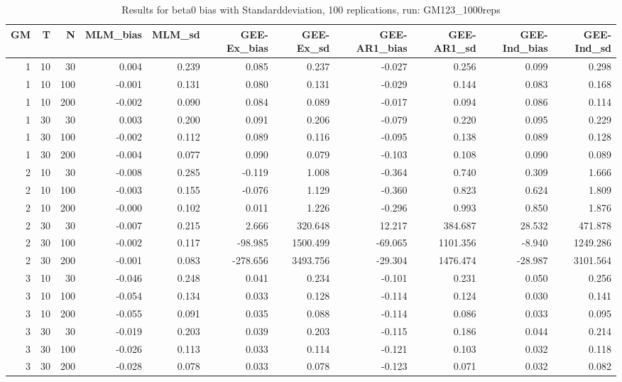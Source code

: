 \begin{table}[ht]
\centering
\begin{tabular}{rrrrrrrrrrr}
  \hline
GM & T & N & MLM\_bias & MLM\_sd & GEE-Ex\_bias & GEE-Ex\_sd & GEE-AR1\_bias & GEE-AR1\_sd & GEE-Ind\_bias & GEE-Ind\_sd \\ 
  \hline
1 & 10 & 30 & 0.004 & 0.239 & 0.085 & 0.237 & -0.027 & 0.256 & 0.099 & 0.298 \\ 
  1 & 10 & 100 & -0.001 & 0.131 & 0.080 & 0.131 & -0.029 & 0.144 & 0.083 & 0.168 \\ 
  1 & 10 & 200 & -0.002 & 0.090 & 0.084 & 0.089 & -0.017 & 0.094 & 0.086 & 0.114 \\ 
  1 & 30 & 30 & 0.003 & 0.200 & 0.091 & 0.206 & -0.079 & 0.220 & 0.095 & 0.229 \\ 
  1 & 30 & 100 & -0.002 & 0.112 & 0.089 & 0.116 & -0.095 & 0.138 & 0.089 & 0.128 \\ 
  1 & 30 & 200 & -0.004 & 0.077 & 0.090 & 0.079 & -0.103 & 0.108 & 0.090 & 0.089 \\ 
   \hline
2 & 10 & 30 & -0.008 & 0.285 & -0.119 & 1.008 & -0.364 & 0.740 & 0.309 & 1.666 \\ 
  2 & 10 & 100 & -0.003 & 0.155 & -0.076 & 1.129 & -0.360 & 0.823 & 0.624 & 1.809 \\ 
  2 & 10 & 200 & -0.000 & 0.102 & 0.011 & 1.226 & -0.296 & 0.993 & 0.850 & 1.876 \\ 
  2 & 30 & 30 & -0.007 & 0.215 & 2.666 & 320.648 & 12.217 & 384.687 & 28.532 & 471.878 \\ 
  2 & 30 & 100 & -0.002 & 0.117 & -98.985 & 1500.499 & -69.065 & 1101.356 & -8.940 & 1249.286 \\ 
  2 & 30 & 200 & -0.001 & 0.083 & -278.656 & 3493.756 & -29.304 & 1476.474 & -28.987 & 3101.564 \\ 
   \hline
3 & 10 & 30 & -0.046 & 0.248 & 0.041 & 0.234 & -0.101 & 0.231 & 0.050 & 0.256 \\ 
  3 & 10 & 100 & -0.054 & 0.134 & 0.033 & 0.128 & -0.114 & 0.124 & 0.030 & 0.141 \\ 
  3 & 10 & 200 & -0.055 & 0.091 & 0.035 & 0.088 & -0.114 & 0.086 & 0.033 & 0.095 \\ 
  3 & 30 & 30 & -0.019 & 0.203 & 0.039 & 0.203 & -0.115 & 0.186 & 0.044 & 0.214 \\ 
  3 & 30 & 100 & -0.026 & 0.113 & 0.033 & 0.114 & -0.121 & 0.103 & 0.032 & 0.118 \\ 
  3 & 30 & 200 & -0.028 & 0.078 & 0.033 & 0.078 & -0.123 & 0.071 & 0.032 & 0.082 \\ 
   \hline
\end{tabular}
\caption{Results for beta0 bias with Standarddeviation, 100 replications, run: GM123_1000reps} 
\label{tab:beta0_bias_sd}
\end{table}
